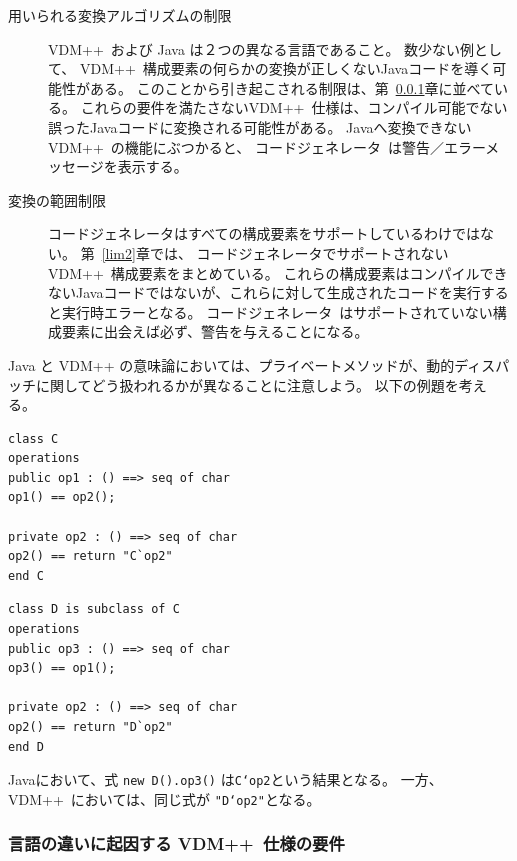 \documentclass[\pformat,11pt]{jarticle}
\newcommand{\tcg}{コードジェネレータ}
\newcommand{\Tcg}{コードジェネレータ}
\newcommand{\VDM}{VDM++}
\begin{document}
\begin{description}
\item[用いられる変換アルゴリズムの制限] \VDM\ および Java は２つの異なる言語であること。 
数少ない例として、 \VDM\ 構成要素の何らかの変換が正しくないJavaコードを導く可能性がある。 
このことから引き起こされる制限は、第~\ref{lim1}章に並べている。
これらの要件を満たさない\VDM\ 仕様は、コンパイル可能でない誤ったJavaコードに変換される可能性がある。
Javaへ変換できない \VDM\ の機能にぶつかると、 \Tcg\ は警告／エラーメッセージを表示する。
\item[変換の範囲制限] コードジェネレータはすべての構成要素をサポートしているわけではない。 
第~\ref{lim2}章では、 \tcg{}でサポートされない \VDM\ 構成要素をまとめている。
これらの構成要素はコンパイルできないJavaコードではないが、これらに対して生成されたコードを実行すると実行時エラーとなる。
\Tcg\ はサポートされていない構成要素に出会えば必ず、警告を与えることになる。
\end{description}

Java と VDM++ の意味論においては、プライベートメソッドが、動的ディスパッチに関してどう扱われるかが異なることに注意しよう。 
以下の例題を考える。

\begin{minipage}{.50\textwidth}
\begin{screen}
\begin{verbatim}
class C
operations
public op1 : () ==> seq of char
op1() == op2();

private op2 : () ==> seq of char
op2() == return "C`op2"
end C
\end{verbatim}
\end{screen}
\end{minipage}
\begin{minipage}{.50\textwidth}
\begin{screen}
\begin{verbatim}
class D is subclass of C
operations
public op3 : () ==> seq of char
op3() == op1();

private op2 : () ==> seq of char
op2() == return "D`op2"
end D
\end{verbatim}
\end{screen}
\end{minipage}

Javaにおいて、式 \texttt{new D().op3()} は\texttt{C`op2}という結果となる。
一方、\VDM\ においては、同じ式が \texttt{"D`op2"}となる。

\subsubsection{言語の違いに起因する \VDM\ 仕様の要件}
\label{lim1}
\end{document}
